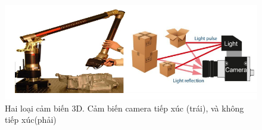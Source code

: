 \begin{figure}[H]
\centering
\includegraphics[width=\linewidth]{resources/chapter1_contact_noncontact3d.png}
\caption[Hai loại cảm biến 3D]{Hai loại cảm biến 3D. Cảm biến camera tiếp xúc (trái), và không tiếp xúc(phải)}
\label{fig:linear_nonlinear_data}
\end{figure}

